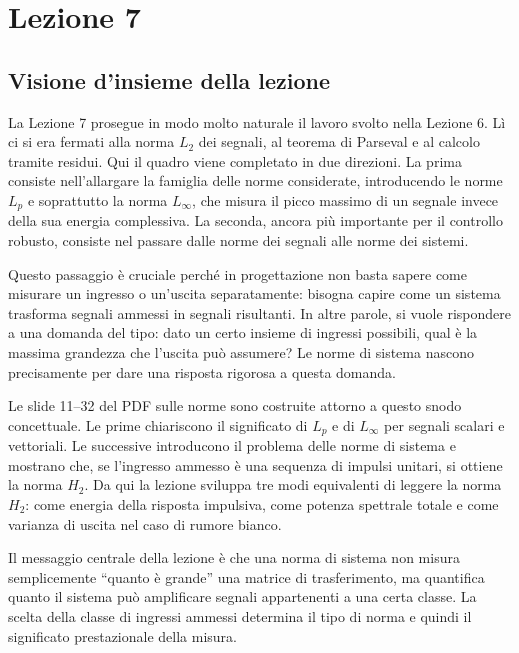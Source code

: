 \documentclass[11pt,a4paper]{article}
\begin{document}
\section{Lezione 7}

\subsection{Visione d'insieme della lezione}

La Lezione 7 prosegue in modo molto naturale il lavoro svolto nella Lezione 6. L\`i ci si era fermati alla norma $L_2$ dei segnali, al teorema di Parseval e al calcolo tramite residui. Qui il quadro viene completato in due direzioni. La prima consiste nell'allargare la famiglia delle norme considerate, introducendo le norme $L_p$ e soprattutto la norma $L_\infty$, che misura il picco massimo di un segnale invece della sua energia complessiva. La seconda, ancora pi\`u importante per il controllo robusto, consiste nel passare dalle norme dei segnali alle norme dei sistemi.

Questo passaggio \`e cruciale perch\'e in progettazione non basta sapere come misurare un ingresso o un'uscita separatamente: bisogna capire come un sistema trasforma segnali ammessi in segnali risultanti. In altre parole, si vuole rispondere a una domanda del tipo: dato un certo insieme di ingressi possibili, qual \`e la massima grandezza che l'uscita pu\`o assumere? Le norme di sistema nascono precisamente per dare una risposta rigorosa a questa domanda.

Le slide 11--32 del PDF sulle norme sono costruite attorno a questo snodo concettuale. Le prime chiariscono il significato di $L_p$ e di $L_\infty$ per segnali scalari e vettoriali. Le successive introducono il problema delle norme di sistema e mostrano che, se l'ingresso ammesso \`e una sequenza di impulsi unitari, si ottiene la norma $H_2$. Da qui la lezione sviluppa tre modi equivalenti di leggere la norma $H_2$: come energia della risposta impulsiva, come potenza spettrale totale e come varianza di uscita nel caso di rumore bianco.

\begin{keybox}
Il messaggio centrale della lezione \`e che una norma di sistema non misura semplicemente ``quanto \`e grande'' una matrice di trasferimento, ma quantifica quanto il sistema pu\`o amplificare segnali appartenenti a una certa classe. La scelta della classe di ingressi ammessi determina il tipo di norma e quindi il significato prestazionale della misura.
\end{keybox}
\end{document}
